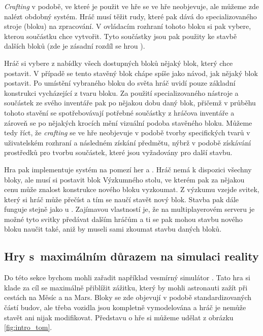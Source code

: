 \textit{Crafting} v podobě, ve které je použit ve hře \MC{} se ve hře \SE{} neobjevuje, ale můžeme zde nalézt obdobný systém. Hráč musí těžit rudy, které pak dává do specializovaného stroje (bloku) na zpracování. V ovládacím rozhraní tohoto bloku si pak vybere, kterou součástku chce vytvořit. Tyto součástky jsou pak použity ke stavbě dalších bloků (zde je zásadní rozdíl se hrou \MC{}).

Hráč si vybere z nabídky všech dostupných bloků nějaký blok, který chce postavit. V případě \SE{} se tento stavěný blok chápe spíše jako návod, jak nějaký blok postavit. Po umístění vybraného bloku do světa hráč uvidí pouze základní konstrukci vycházející z tvaru bloku. Za použití specializovaného nástroje a součástek ze svého inventáře pak po nějakou dobu  daný blok, přičemž v průběhu tohoto stavění se spotřebovávají potřebné součástky z hráčova inventáře a zároveň se po nějakých krocích mění vizuální podoba stavěného bloku. Můžeme tedy říct, že \textit{crafting} se ve hře \SE{} neobjevuje v podobě tvorby specifických tvarů v uživatelském rozhraní a následném získání předmětu, nýbrž v podobě získávání prostředků pro tvorbu součástek, které jsou vyžadovány pro další stavbu.

Hra \ME{} pak implementuje systém na pomezí her \MC{} a \SE{}. Hráč nemá k dispozici všechny bloky, ale musí si postavit blok Výzkumného stolu, ve kterém pak za nějakou cenu může znalost konstrukce nového bloku vyzkoumat. Z výzkumu vzejde svitek, který si hráč může přečíst a tím se naučí stavět nový blok. Stavba pak dále funguje stejně jako u \SE{}. Zajímavou vlastností je, že na multiplayerovém serveru je možné tyto svitky předávat dalším hráčům a ti se pak mohou stavbu nového bloku naučit také, aniž by museli sami zkoumat stavbu daných bloků.




\subsection{Hry s~maximálním důrazem na simulaci reality}

Do této sekce bychom mohli zařadit například vesmírný simulátor \TM{}. Tato hra si klade za cíl se maximálně přiblížit zážitku, který by mohli astronauti zažít při cestách na Měsíc a na Mars. Bloky se zde objevují v podobě standardizovaných částí budov, ale třeba vozidla jsou kompletně vymodelována a hráč je nemůže stavět ani nijak modifikovat. Představu o hře si můžeme udělat z obrázku \ref{fig:intro_tom}.

